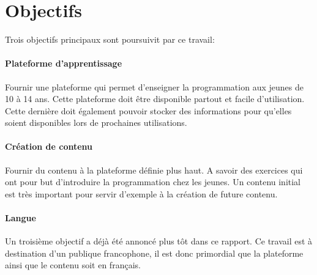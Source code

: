 \section{Objectifs}
\label{intro-objectifs}

Trois objectifs principaux sont poursuivit par ce travail:

\paragraph{Plateforme d'apprentissage} Fournir une plateforme qui permet d'enseigner la programmation aux jeunes de 10 à 14 ans. Cette plateforme doit être disponible partout et facile d'utilisation. Cette dernière doit également pouvoir stocker des informations pour qu'elles soient disponibles lors de prochaines utilisations.

\paragraph{Création de contenu} Fournir du contenu à la plateforme définie plus haut. A savoir des exercices qui ont pour but d'introduire la programmation chez les jeunes. Un contenu initial est très important pour servir d'exemple à la création de future contenu.


\paragraph{Langue} Un troisième objectif a déjà été annoncé plus tôt dans ce rapport. Ce travail est à destination d'un publique francophone, il est donc primordial que la plateforme ainsi que le contenu soit en français.



%
%
%
%

